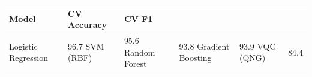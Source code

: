 \begin{tabular}{lll}
\toprule
Model & CV Accuracy & CV F1 \\
\midrule
Logistic Regression & 96.7%
SVM (RBF) & 95.6%
Random Forest & 93.8%
Gradient Boosting & 93.9%
VQC (QNG) & 84.4%
\bottomrule
\end{tabular}
